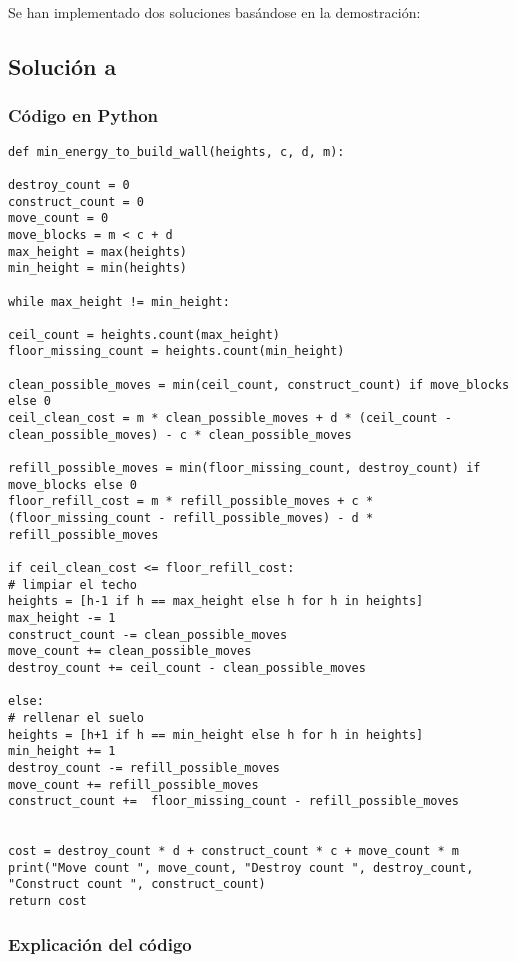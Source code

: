 \documentclass[a4paper,12pt]{article}
\begin{document}
Se han implementado dos soluciones basándose en la demostración:

\subsection{Solución a}

\subsubsection{Código en Python}
\begin{verbatim}
def min_energy_to_build_wall(heights, c, d, m):

destroy_count = 0
construct_count = 0
move_count = 0
move_blocks = m < c + d
max_height = max(heights)
min_height = min(heights)

while max_height != min_height:   

ceil_count = heights.count(max_height)
floor_missing_count = heights.count(min_height)

clean_possible_moves = min(ceil_count, construct_count) if move_blocks else 0
ceil_clean_cost = m * clean_possible_moves + d * (ceil_count - clean_possible_moves) - c * clean_possible_moves

refill_possible_moves = min(floor_missing_count, destroy_count) if move_blocks else 0
floor_refill_cost = m * refill_possible_moves + c * (floor_missing_count - refill_possible_moves) - d * refill_possible_moves

if ceil_clean_cost <= floor_refill_cost:
# limpiar el techo
heights = [h-1 if h == max_height else h for h in heights]
max_height -= 1
construct_count -= clean_possible_moves
move_count += clean_possible_moves
destroy_count += ceil_count - clean_possible_moves

else: 
# rellenar el suelo
heights = [h+1 if h == min_height else h for h in heights]
min_height += 1
destroy_count -= refill_possible_moves
move_count += refill_possible_moves
construct_count +=  floor_missing_count - refill_possible_moves


cost = destroy_count * d + construct_count * c + move_count * m
print("Move count ", move_count, "Destroy count ", destroy_count, "Construct count ", construct_count)
return cost
\end{verbatim}

\subsubsection{Explicación del código}
\end{document}
